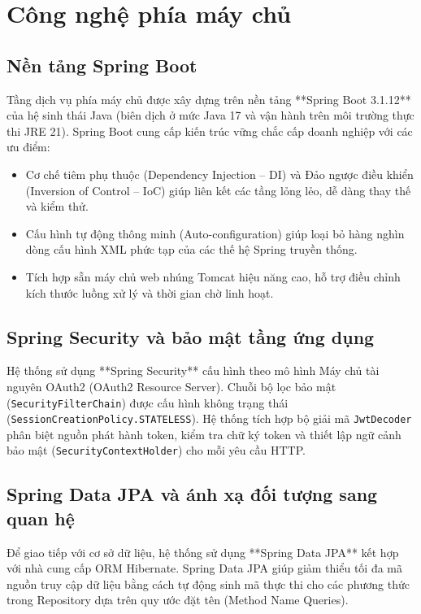 \section{Công nghệ phía máy chủ}
\label{sec:cn_backend}

\subsection{Nền tảng Spring Boot}
Tầng dịch vụ phía máy chủ được xây dựng trên nền tảng **Spring Boot 3.1.12** \cite{spring_boot_docs} của hệ sinh thái Java (biên dịch ở mức Java 17 và vận hành trên môi trường thực thi JRE 21). Spring Boot cung cấp kiến trúc vững chắc cấp doanh nghiệp với các ưu điểm:
\begin{itemize}
    \item Cơ chế tiêm phụ thuộc (Dependency Injection -- DI) và Đảo ngược điều khiển (Inversion of Control -- IoC) giúp liên kết các tầng lỏng lẻo, dễ dàng thay thế và kiểm thử.
    \item Cấu hình tự động thông minh (Auto-configuration) giúp loại bỏ hàng nghìn dòng cấu hình XML phức tạp của các thế hệ Spring truyền thống.
    \item Tích hợp sẵn máy chủ web nhúng Tomcat hiệu năng cao, hỗ trợ điều chỉnh kích thước luồng xử lý và thời gian chờ linh hoạt.
\end{itemize}

\subsection{Spring Security và bảo mật tầng ứng dụng}
Hệ thống sử dụng **Spring Security** \cite{spring_security_docs} cấu hình theo mô hình Máy chủ tài nguyên OAuth2 (OAuth2 Resource Server). Chuỗi bộ lọc bảo mật (\texttt{SecurityFilterChain}) được cấu hình không trạng thái (\texttt{SessionCreationPolicy.STATELESS}). Hệ thống tích hợp bộ giải mã \texttt{JwtDecoder} phân biệt nguồn phát hành token, kiểm tra chữ ký token và thiết lập ngữ cảnh bảo mật (\texttt{SecurityContextHolder}) cho mỗi yêu cầu HTTP.

\subsection{Spring Data JPA và ánh xạ đối tượng sang quan hệ}
Để giao tiếp với cơ sở dữ liệu, hệ thống sử dụng **Spring Data JPA** kết hợp với nhà cung cấp ORM Hibernate. Spring Data JPA giúp giảm thiểu tối đa mã nguồn truy cập dữ liệu bằng cách tự động sinh mã thực thi cho các phương thức trong Repository dựa trên quy ước đặt tên (Method Name Queries).


